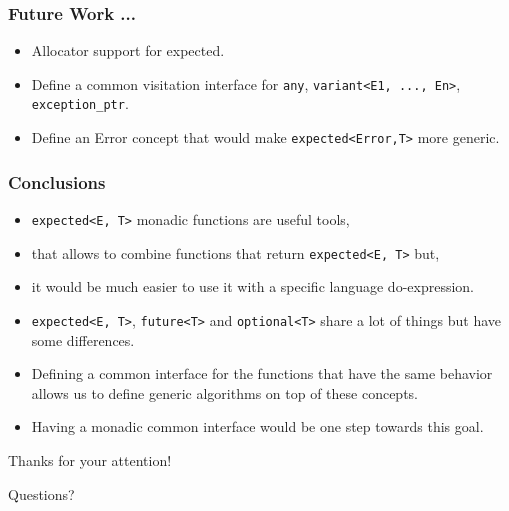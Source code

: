 \documentclass[xcolor=dvipsnames]{beamer}
\newcommand{\cpp}[1]{\lstinline{#1}}
\begin{document}
\begin{frame}
\frametitle{Future Work ...}

\begin{itemize}
  \item Allocator support for expected.
  \item Define a common visitation interface for \cpp{any}, \cpp{variant<E1, ..., En>}, \cpp{exception_ptr}.
  \item Define an Error concept that would make \cpp{expected<Error,T>} more generic.
\end{itemize}

\end{frame}
\begin{frame}
\frametitle{Conclusions}

\begin{itemize}
  \item \cpp{expected<E, T>} monadic functions are useful tools, 
  \item that allows to combine functions that return \cpp{expected<E, T>} but,
  \item it would be much easier to use it with a specific language do-expression.
\end{itemize}

\begin{itemize}
  \item \cpp{expected<E, T>}, \cpp{future<T>} and \cpp{optional<T>} share a lot of things but have some differences.
  \item Defining a common interface for the functions that have the same behavior allows us to define generic algorithms on top of these concepts.
  \item Having a monadic common interface would be one step towards this goal.
\end{itemize}

\end{frame}
\begin{frame}
\begin{center}
\Large{Thanks for your attention!}
\end{center}
\begin{center}
\Large{Questions?}
\end{center}
\end{frame}



\end{document}
